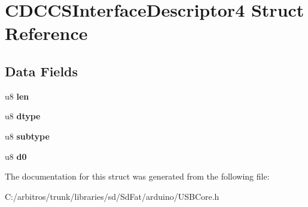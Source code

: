 \hypertarget{struct_c_d_c_c_s_interface_descriptor4}{\section{C\-D\-C\-C\-S\-Interface\-Descriptor4 Struct Reference}
\label{struct_c_d_c_c_s_interface_descriptor4}
}
\subsection*{Data Fields}
\begin{DoxyCompactItemize}
\item 
\hypertarget{struct_c_d_c_c_s_interface_descriptor4_afbf3f3230446569534d5f466aaf4c23b}{u8 {\bfseries len}}\label{struct_c_d_c_c_s_interface_descriptor4_afbf3f3230446569534d5f466aaf4c23b}

\item 
\hypertarget{struct_c_d_c_c_s_interface_descriptor4_a0bb419531ec75697e63e9109fecf81b0}{u8 {\bfseries dtype}}\label{struct_c_d_c_c_s_interface_descriptor4_a0bb419531ec75697e63e9109fecf81b0}

\item 
\hypertarget{struct_c_d_c_c_s_interface_descriptor4_afb82dd1313bc5284e4e5aef8218ef414}{u8 {\bfseries subtype}}\label{struct_c_d_c_c_s_interface_descriptor4_afb82dd1313bc5284e4e5aef8218ef414}

\item 
\hypertarget{struct_c_d_c_c_s_interface_descriptor4_a3e359aaf0f33f4eeedb3f26e73ac1cc7}{u8 {\bfseries d0}}\label{struct_c_d_c_c_s_interface_descriptor4_a3e359aaf0f33f4eeedb3f26e73ac1cc7}

\end{DoxyCompactItemize}


The documentation for this struct was generated from the following file\-:\begin{DoxyCompactItemize}
\item 
C\-:/arbitros/trunk/libraries/sd/\-Sd\-Fat/arduino/U\-S\-B\-Core.\-h\end{DoxyCompactItemize}
